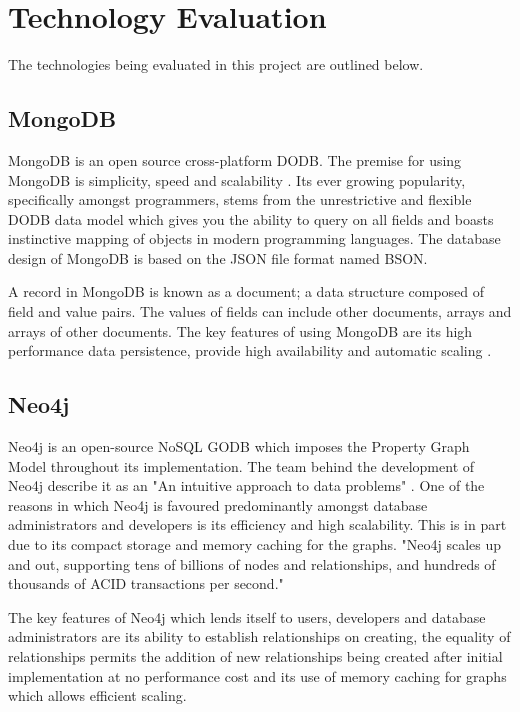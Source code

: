 \section{Technology Evaluation}\label{techeval}
The technologies being evaluated in this project are outlined below.

\subsection{MongoDB}\label{mongo}
MongoDB is an open source cross-platform DODB. The premise for using MongoDB is simplicity, speed and scalability  \cite{md}. Its ever growing popularity, specifically amongst programmers, stems from the unrestrictive and flexible DODB data model which gives you the ability to query on all fields and boasts instinctive mapping of objects in modern programming languages. \cite{md} The database design of MongoDB is based on the JSON file format named BSON. 

A record in MongoDB is known as a document; a data structure composed of field and value pairs. The values of fields can include other documents, arrays and arrays of other documents. The key features of using MongoDB are its high performance data persistence, provide high availability and automatic scaling  \cite{md}.

\subsection{Neo4j}\label{neo}
Neo4j is an open-source NoSQL GODB which imposes the Property Graph Model throughout its implementation. The team behind the development of Neo4j describe it as an "An intuitive approach to data problems" \cite{ndweb}. One of the reasons in which Neo4j is favoured predominantly amongst database administrators and developers is its efficiency and high scalability. This is in part due to its compact storage and memory caching for the graphs. "Neo4j scales up and out, supporting tens of billions of nodes and relationships, and hundreds of thousands of ACID transactions per second." \cite{ndweb}

The key features of Neo4j which lends itself to users, developers and database administrators are its ability to establish relationships on creating, the equality of relationships permits the addition of new relationships being created after initial implementation at no performance cost and its use of memory caching for graphs which allows efficient scaling.

